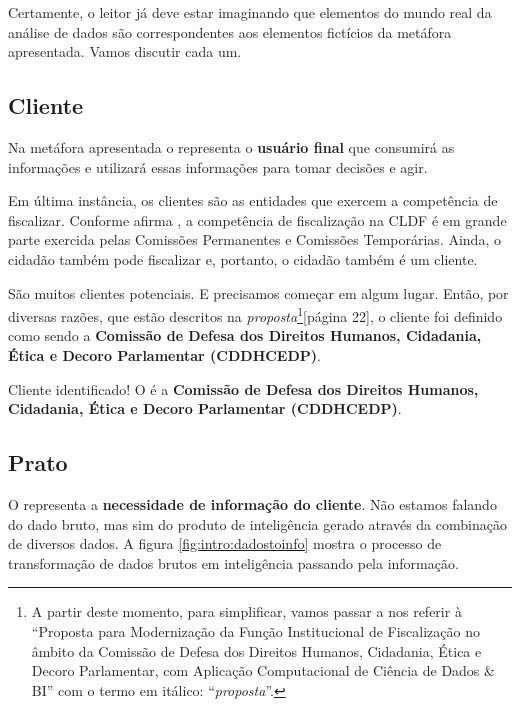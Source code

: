 Certamente, o leitor já deve estar imaginando que elementos do mundo real da análise de dados são correspondentes aos elementos fictícios da metáfora apresentada. Vamos discutir cada um.

\subsection*{Cliente}
\label{sub-cliente}
    Na metáfora apresentada o \CLIENTEDORESTAURANTE \xspace representa o \textbf{usuário final} que consumirá as informações e utilizará essas informações para tomar decisões e agir.
    
    Em última instância, os clientes são as entidades que exercem a competência de fiscalizar. Conforme afirma \cite[20]{propostaCDDHCEDP}, a competência de fiscalização na CLDF é em grande parte exercida pelas Comissões Permanentes e Comissões Temporárias. Ainda, o cidadão também pode fiscalizar e, portanto, o cidadão também é um cliente.
    
    São muitos clientes potenciais. E precisamos começar em algum lugar. Então, por diversas razões, que estão descritos na \emph{proposta}\footnote{A partir deste momento, para simplificar, vamos passar a nos referir à ``Proposta para Modernização da Função Institucional de Fiscalização no âmbito da Comissão de Defesa dos Direitos Humanos, Cidadania, Ética e Decoro Parlamentar, com Aplicação Computacional de Ciência de Dados \& BI'' \cite{propostaCDDHCEDP} com o termo em itálico: ``\emph{proposta}''.}[página 22], o cliente foi definido como sendo a \textbf{Comissão de Defesa dos Direitos Humanos, Cidadania, Ética e Decoro Parlamentar (CDDHCEDP)}.
    
    \begin{env-destaque}{Cliente identificado!}
        O \CLIENTE \xspace é a \textbf{Comissão de Defesa dos Direitos Humanos, Cidadania, Ética e Decoro Parlamentar (CDDHCEDP)}.
    \end{env-destaque}

\subsection*{Prato}
\label{sub-prato}

    O \PRATO \xspace representa a \textbf{necessidade de informação do cliente}. Não estamos falando do dado bruto, mas sim do produto de inteligência gerado através da combinação de diversos dados. A figura \ref{fig:intro:dadostoinfo} mostra o processo de transformação de dados brutos em inteligência passando pela informação. 
    
